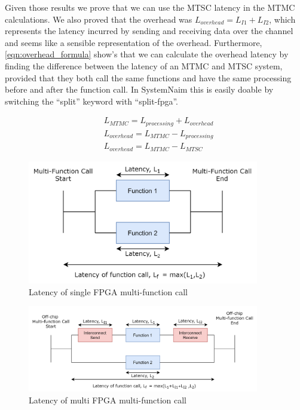 Given those results we prove that we can use the MTSC latency in the MTMC calculations. We also proved that the overhead was $L_{overhead} = L_{I1} + L_{I2}$, which represents the latency incurred by sending and receiving data over the channel and seems like a sensible representation of the overhead. Furthermore, \autoref{eqn:overhead_formula} show's that we can calculate the overhead latency by finding the difference between the latency of an MTMC and MTSC system, provided that they both call the same functions and have the same processing before and after the function call. In SystemNaim this is easily doable by switching the “split” keyword with “split-fpga”. 

\begin{align}
    &L_{MTMC} = L_{processing} + L_{overhead} \\
    &L_{overhead} = L_{MTMC} - L_{processing}  \\
    &L_{overhead} = L_{MTMC} - L_{MTSC}\label{eqn:overhead_formula}
\end{align}

\begin{figure}[!htb]
    \centering
    \includegraphics[width=0.9\textwidth]{05_evaluation/images/concurrent_latency.png}
    \caption{Latency of single FPGA multi-function call}
    \label{fig:multi_func_call}
\end{figure}

\begin{figure}[!htb]
    \centering
    \includegraphics[width=0.9\textwidth]{05_evaluation/images/offchip_latency.png}
    \caption{Latency of multi FPGA multi-function call}
    \label{fig:multi_fpga_call}
\end{figure}

